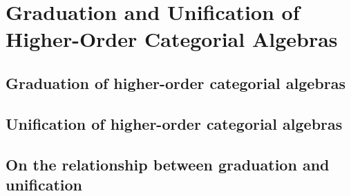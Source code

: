 \documentclass{amsart}
\theoremstyle{plain}
\theoremstyle{definition}
\begin{document}

\section{Graduation and Unification of Higher-Order Categorial Algebras}

\subsection{Graduation of higher-order categorial algebras}

\subsection{Unification of higher-order categorial algebras}

\subsection{On the relationship between graduation and unification}
\end{document}
